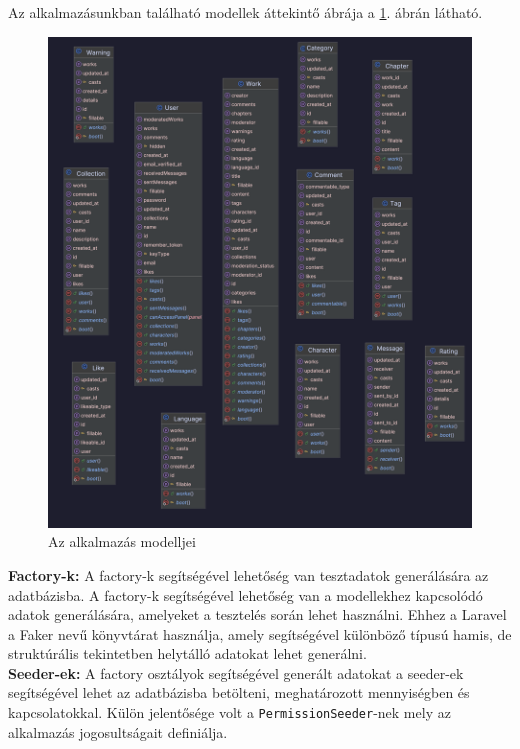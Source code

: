 Az alkalmazásunkban található modellek áttekintő ábrája a \ref{fig:models}. ábrán látható.

\begin{figure}[H]
    \centering
    \includegraphics[scale=0.1]{./figures/models.png}
    \caption{Az alkalmazás modelljei}
    \label{fig:models}
\end{figure}


\textbf{Factory-k:}
A factory-k segítségével lehetőség van tesztadatok generálására az adatbázisba. A factory-k segítségével lehetőség van a modellekhez kapcsolódó adatok generálására, amelyeket a tesztelés során lehet használni. Ehhez a Laravel a Faker nevű könyvtárat használja, amely segítségével különböző típusú hamis, de struktúrális tekintetben helytálló adatokat lehet generálni.\\

\textbf{Seeder-ek:} A factory osztályok segítségével generált adatokat a seeder-ek segítségével lehet az adatbázisba betölteni, meghatározott mennyiségben és kapcsolatokkal. Külön jelentősége volt a \texttt{PermissionSeeder}-nek mely az alkalmazás jogosultságait definiálja.\\

